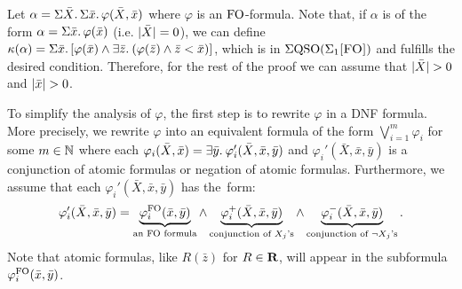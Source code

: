   Let $\alpha =  \Sigma{\bar{X}}.\,\Sigma{\bar{x}}.\, \varphi(\bar{X},\bar{x})$ where $\varphi$ is an  ${\rm FO}$-formula.
Note that, if $\alpha$ is of the form $\alpha = \Sigma{\bar{x}}.\, \varphi(\bar{x})$ (i.e. $\vert \bar{X} \vert = 0$), we can define $\kappa(\alpha) = \Sigma{\bar{x}}.\, [\varphi(\bar{x})\wedge \exists{\bar{z}}.\:(\varphi(\bar{z})\wedge\bar{z} < \bar{x})]$, which is in $\Sigma{\rm QSO}(\Sigma_{1}\textsc{[FO]})$ and fulfills the desired condition. 
Therefore, for the rest of the proof we can assume that $\vert \bar{X} \vert > 0$ and $\vert \bar{x} \vert > 0$.

To simplify the analysis of $\varphi$, the first step is to rewrite $\varphi$ in a DNF formula. 
More precisely, we rewrite $\varphi$ into an equivalent formula of the form $\bigvee_{i = 1}^m \varphi_i$ for some $m\in \mathbb{N}$ where each $\varphi_i(\bar{X}, \bar{x}) = \exists{\bar{y}}.\: \varphi_i'(\bar{X}, \bar{x}, \bar{y})$ and $\varphi_i'(\bar{X}, \bar{x}, \bar{y})$ is a conjunction of atomic formulas or negation of atomic formulas. Furthermore, we assume that each $\varphi_i'(\bar{X}, \bar{x}, \bar{y})$ has the~form:
$$
\varphi_i'(\bar{X}, \bar{x}, \bar{y}) =  \underbrace{\varphi_i^{{\rm FO}}(\bar{x},\bar{y})}_{\text{an ${\rm FO}$ formula}} \wedge 
\underbrace{\varphi_i^{+}(\bar{X},\bar{x},\bar{y})}_{\text{conjunction of $X_j$'s}} \wedge
\underbrace{\varphi_i^{-}(\bar{X},\bar{x},\bar{y})}_{\text{conjunction of $\neg X_j$'s}}.
$$
Note that atomic formulas, like $R(\bar{z})$ for $R \in \mathbf{R}$, will appear in the subformula $\varphi_i^{{\rm FO}}(\bar{x},\bar{y})$. 

